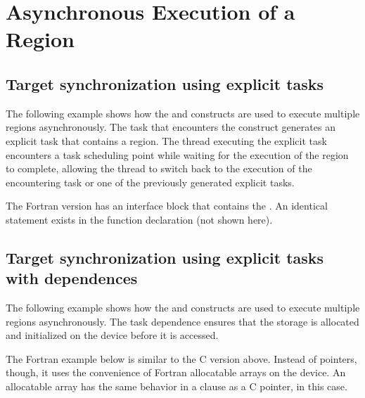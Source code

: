 \pagebreak
\chapter{Asynchronous Execution of a  Region}
\label{chap:async_target}

\section{Target synchronization using explicit tasks}
\label{section:target_synchronization_using_explicit_tasks}

The following example shows how the  and  constructs 
are used to execute multiple  regions asynchronously. The task that 
encounters the  construct generates an explicit task that contains 
a  region. The thread executing the explicit task encounters a task 
scheduling point while waiting for the execution of the  region 
to complete, allowing the thread to switch back to the execution of the encountering 
task or one of the previously generated explicit tasks.


The Fortran version has an interface block that contains the  . 
An identical statement exists in the function declaration (not shown here).







\section{Target synchronization using explicit tasks with dependences}
\label{section:target_synchronization_using_explicit_tasks_with_dependences}

The following example shows how the  and  constructs 
are used to execute multiple  regions asynchronously. The task dependence 
ensures that the storage is allocated and initialized on the device before it is 
accessed.


The Fortran example below is similar to the C version above. Instead of pointers, though, it uses
the convenience of Fortran allocatable arrays on the device. An allocatable array has the
same behavior in a  clause as a C pointer, in this case.

